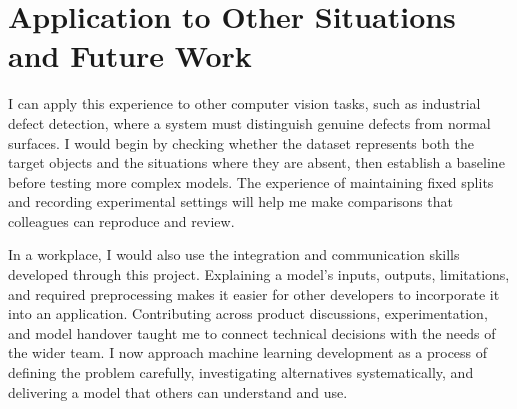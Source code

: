 \documentclass[11pt,a4paper]{article}
\begin{document}
\section{Application to Other Situations and Future Work}
I can apply this experience to other computer vision tasks, such as industrial defect detection, where a system must distinguish genuine defects from normal surfaces. I would begin by checking whether the dataset represents both the target objects and the situations where they are absent, then establish a baseline before testing more complex models. The experience of maintaining fixed splits and recording experimental settings will help me make comparisons that colleagues can reproduce and review.

In a workplace, I would also use the integration and communication skills developed through this project. Explaining a model's inputs, outputs, limitations, and required preprocessing makes it easier for other developers to incorporate it into an application. Contributing across product discussions, experimentation, and model handover taught me to connect technical decisions with the needs of the wider team. I now approach machine learning development as a process of defining the problem carefully, investigating alternatives systematically, and delivering a model that others can understand and use.
\end{document}
